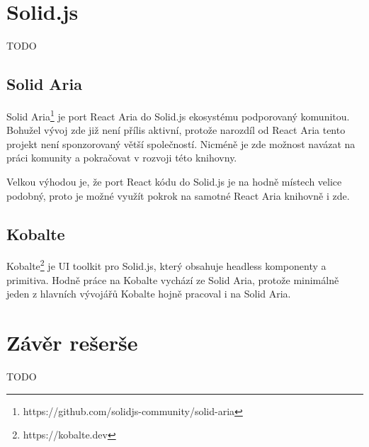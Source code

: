 \section{Solid.js}

TODO

\subsection{Solid Aria}

Solid Aria\footnote{https://github.com/solidjs-community/solid-aria} je port React Aria do Solid.js ekosystému podporovaný komunitou.
Bohužel vývoj zde již není přílis aktivní, protože narozdíl od React Aria tento projekt není sponzorovaný větší společností.
Nicméně je zde možnost navázat na práci komunity a pokračovat v rozvoji této knihovny.

Velkou výhodou je, že port React kódu do Solid.js je na hodně místech velice podobný, proto je možné využít pokrok na samotné React Aria knihovně i zde.

\subsection{Kobalte}

Kobalte\footnote{https://kobalte.dev} je UI toolkit pro Solid.js, který obsahuje headless komponenty a primitiva.
Hodně práce na Kobalte vychází ze Solid Aria, protože minimálně jeden z hlavních vývojářů Kobalte hojně pracoval i na Solid Aria.

\section{Závěr rešerše}

TODO
